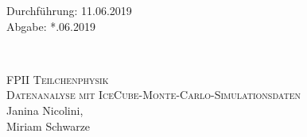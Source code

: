 



\begin{titlepage}
  \begin{flushleft}
 Durchführung: 11.06.2019\\
 Abgabe: *.06.2019
  \end{flushleft}


\HRule\\[1,0cm]

 \begin{center}


\textsc{\LARGE FPII Teilchenphysik}\\[1.5cm]
\textsc{\huge Datenanalyse mit IceCube-Monte-Carlo-Simulationsdaten} \\[5,5cm]

Janina Nicolini\footnotemark[1], \\
Miriam Schwarze\footnotemark[2] \\[1,0cm]



 \end{center}
\HRule

 \vfill

\end{titlepage}






\printbibliography


